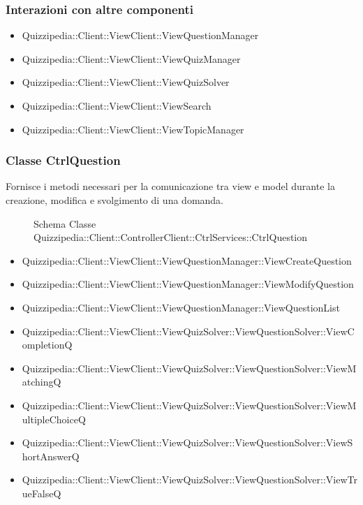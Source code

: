 \subsubsection{Interazioni con altre componenti}
\begin{itemize}
\item Quizzipedia::Client::ViewClient::ViewQuestionManager
\item Quizzipedia::Client::ViewClient::ViewQuizManager
\item Quizzipedia::Client::ViewClient::ViewQuizSolver
\item Quizzipedia::Client::ViewClient::ViewSearch
\item Quizzipedia::Client::ViewClient::ViewTopicManager
\end{itemize}
\subsubsection{Classe CtrlQuestion}
Fornisce i metodi necessari per la comunicazione tra view e model durante la creazione, modifica e svolgimento di una domanda.
\begin{figure}[H]
\centering
\noindent{}
\caption{Schema Classe Quizzipedia::Client::ControllerClient::CtrlServices::CtrlQuestion}
\end{figure}
\begin{itemize}
\item Quizzipedia::Client::ViewClient::ViewQuestionManager::ViewCreateQuestion
\item Quizzipedia::Client::ViewClient::ViewQuestionManager::ViewModifyQuestion
\item Quizzipedia::Client::ViewClient::ViewQuestionManager::ViewQuestionList
\item Quizzipedia::Client::ViewClient::ViewQuizSolver::ViewQuestionSolver::ViewCompletionQ
\item Quizzipedia::Client::ViewClient::ViewQuizSolver::ViewQuestionSolver::ViewMatchingQ
\item Quizzipedia::Client::ViewClient::ViewQuizSolver::ViewQuestionSolver::ViewMultipleChoiceQ
\item Quizzipedia::Client::ViewClient::ViewQuizSolver::ViewQuestionSolver::ViewShortAnswerQ
\item Quizzipedia::Client::ViewClient::ViewQuizSolver::ViewQuestionSolver::ViewTrueFalseQ
\end{itemize}
